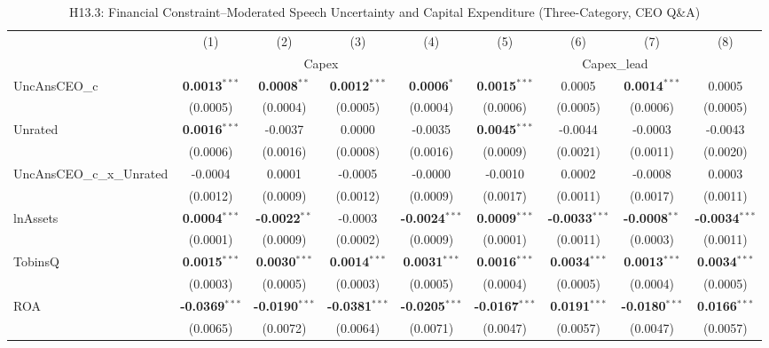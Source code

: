 \documentclass[11pt,a4paper]{article}
\begin{document}
\begin{table}[htbp]
\centering
\caption{H13.3: Financial Constraint--Moderated Speech Uncertainty and Capital Expenditure (Three-Category, CEO Q\&A)}
\label{tab:h13_3}
\scriptsize
\begin{tabular}{lcccccccc}
\toprule
 & (1) & (2) & (3) & (4) & (5) & (6) & (7) & (8) \\
 & \multicolumn{4}{c}{Capex} & \multicolumn{4}{c}{Capex\_lead} \\
\cmidrule(lr){2-5} \cmidrule(lr){6-9}
\midrule
UncAnsCEO\_c & \textbf{0.0013}$^{***}$ & \textbf{0.0008}$^{**}$ & \textbf{0.0012}$^{***}$ & \textbf{0.0006}$^{*}$ & \textbf{0.0015}$^{***}$ & 0.0005 & \textbf{0.0014}$^{***}$ & 0.0005 \\
 & (0.0005) & (0.0004) & (0.0005) & (0.0004) & (0.0006) & (0.0005) & (0.0006) & (0.0005) \\
Unrated & \textbf{0.0016}$^{***}$ & -0.0037 & 0.0000 & -0.0035 & \textbf{0.0045}$^{***}$ & -0.0044 & -0.0003 & -0.0043 \\
 & (0.0006) & (0.0016) & (0.0008) & (0.0016) & (0.0009) & (0.0021) & (0.0011) & (0.0020) \\
UncAnsCEO\_c\_x\_Unrated & -0.0004 & 0.0001 & -0.0005 & -0.0000 & -0.0010 & 0.0002 & -0.0008 & 0.0003 \\
 & (0.0012) & (0.0009) & (0.0012) & (0.0009) & (0.0017) & (0.0011) & (0.0017) & (0.0011) \\
\midrule
lnAssets & \textbf{0.0004}$^{***}$ & \textbf{-0.0022}$^{**}$ & -0.0003 & \textbf{-0.0024}$^{***}$ & \textbf{0.0009}$^{***}$ & \textbf{-0.0033}$^{***}$ & \textbf{-0.0008}$^{**}$ & \textbf{-0.0034}$^{***}$ \\
 & (0.0001) & (0.0009) & (0.0002) & (0.0009) & (0.0001) & (0.0011) & (0.0003) & (0.0011) \\
TobinsQ & \textbf{0.0015}$^{***}$ & \textbf{0.0030}$^{***}$ & \textbf{0.0014}$^{***}$ & \textbf{0.0031}$^{***}$ & \textbf{0.0016}$^{***}$ & \textbf{0.0034}$^{***}$ & \textbf{0.0013}$^{***}$ & \textbf{0.0034}$^{***}$ \\
 & (0.0003) & (0.0005) & (0.0003) & (0.0005) & (0.0004) & (0.0005) & (0.0004) & (0.0005) \\
ROA & \textbf{-0.0369}$^{***}$ & \textbf{-0.0190}$^{***}$ & \textbf{-0.0381}$^{***}$ & \textbf{-0.0205}$^{***}$ & \textbf{-0.0167}$^{***}$ & \textbf{0.0191}$^{***}$ & \textbf{-0.0180}$^{***}$ & \textbf{0.0166}$^{***}$ \\
 & (0.0065) & (0.0072) & (0.0064) & (0.0071) & (0.0047) & (0.0057) & (0.0047) & (0.0057) \\

\end{tabular}
\end{table}
\end{document}
